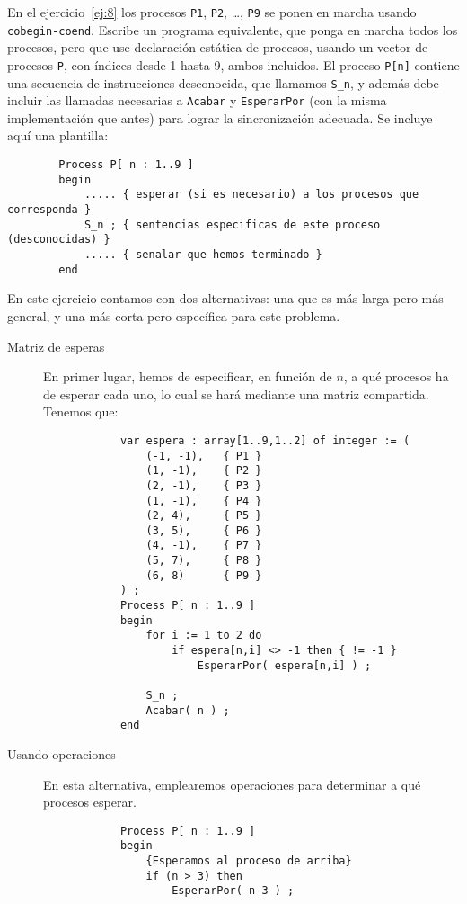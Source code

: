 \begin{ejercicio}
    En el ejercicio~\ref{ej:8} los procesos \verb|P1|, \verb|P2|, \ldots, \verb|P9| se ponen en marcha usando \verb|cobegin-coend|.
    Escribe un programa equivalente, que ponga en marcha todos los procesos, pero que use declaración
    estática de procesos, usando un vector de procesos \verb|P|, con índices desde 1 hasta 9, ambos incluidos. El proceso \verb|P[n]| contiene una secuencia de instrucciones desconocida, que llamamos \verb|S_n|, y además debe incluir las llamadas necesarias a \verb|Acabar| y \verb|EsperarPor| (con la misma implementación que antes) para lograr la sincronización adecuada. Se incluye aquí una plantilla:
    \begin{verbatim}
        Process P[ n : 1..9 ]
        begin
            ..... { esperar (si es necesario) a los procesos que corresponda }
            S_n ; { sentencias especificas de este proceso (desconocidas) }
            ..... { senalar que hemos terminado }
        end
    \end{verbatim}

    En este ejercicio contamos con dos alternativas: una que es más larga pero más general, y una más corta pero específica para este problema.
    \begin{description}
        \item[Matriz de esperas]
        En primer lugar, hemos de especificar, en función de $n$, a qué procesos ha de esperar cada uno, lo cual se hará mediante una matriz compartida. Tenemos que:
        \begin{verbatim}
            var espera : array[1..9,1..2] of integer := (
                (-1, -1),   { P1 }
                (1, -1),    { P2 }
                (2, -1),    { P3 }
                (1, -1),    { P4 }
                (2, 4),     { P5 }
                (3, 5),     { P6 }
                (4, -1),    { P7 }
                (5, 7),     { P8 }
                (6, 8)      { P9 }
            ) ;
            Process P[ n : 1..9 ]
            begin
                for i := 1 to 2 do
                    if espera[n,i] <> -1 then { != -1 }
                        EsperarPor( espera[n,i] ) ;
                
                S_n ;
                Acabar( n ) ;
            end
        \end{verbatim}

        \item[Usando operaciones]
        En esta alternativa, emplearemos operaciones para determinar a qué procesos esperar.
        \begin{verbatim}
            Process P[ n : 1..9 ]
            begin
                {Esperamos al proceso de arriba}
                if (n > 3) then
                    EsperarPor( n-3 ) ;
                

\end{verbatim}
\end{description}
\end{ejercicio}
